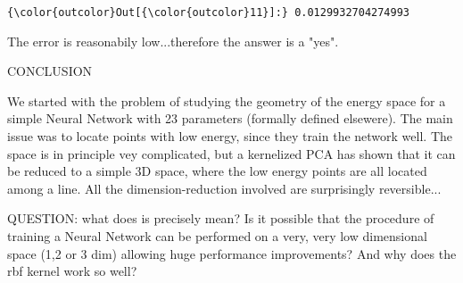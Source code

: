 \documentclass[11pt]{article}
\begin{document}
\begin{Verbatim}[commandchars=\\\{\}]
{\color{outcolor}Out[{\color{outcolor}11}]:} 0.0129932704274993
\end{Verbatim}
            
    The error is reasonabily low...therefore the answer is a "yes".

    CONCLUSION

    We started with the problem of studying the geometry of the energy space
for a simple Neural Network with 23 parameters (formally defined
elsewere). The main issue was to locate points with low energy, since
they train the network well. The space is in principle vey complicated,
but a kernelized PCA has shown that it can be reduced to a simple 3D
space, where the low energy points are all located among a line. All the
dimension-reduction involved are surprisingly reversible...

    QUESTION: what does is precisely mean? Is it possible that the procedure
of training a Neural Network can be performed on a very, very low
dimensional space (1,2 or 3 dim) allowing huge performance improvements?
And why does the rbf kernel work so well?


    
    
    
    
\end{document}
